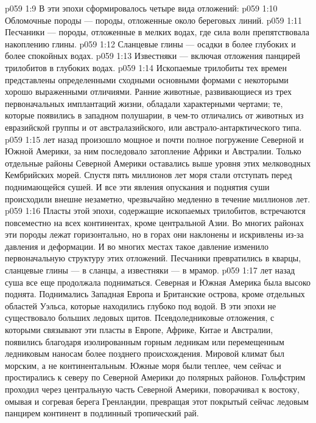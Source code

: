 \vs p059 1:9 \pc В эти эпохи сформировалось четыре вида отложений:
\vs p059 1:10 \bibnobreakspace Обломочные породы --- породы, отложенные около береговых линий.
\vs p059 1:11 \bibnobreakspace Песчаники --- породы, отложенные в мелких водах, где сила волн препятствовала накоплению глины.
\vs p059 1:12 \bibnobreakspace Сланцевые глины --- осадки в более глубоких и более спокойных водах.
\vs p059 1:13 \bibnobreakspace Известняки --- включая отложения панцирей трилобитов в глубоких водах.
\vs p059 1:14 \pc Ископаемые трилобиты тех времен представлены определенными сходными основными формами с некоторыми хорошо выраженными отличиями. Ранние животные, развивающиеся из трех первоначальных имплантаций жизни, обладали характерными чертами; те, которые появились в западном полушарии, в чем\hyp{}то отличались от животных из евразийской группы и от австралазийского, или австрало\hyp{}антарктического типа.
\vs p059 1:15 \pc {} лет назад произошло мощное и почти полное погружение Северной и Южной Америки, за ним последовало затопление Африки и Австралии. Только отдельные районы Северной Америки оставались выше уровня этих мелководных Кембрийских морей. Спустя пять миллионов лет моря стали отступать перед поднимающейся сушей. И все эти явления опускания и поднятия суши происходили внешне незаметно, чрезвычайно медленно в течение миллионов лет.
\vs p059 1:16 Пласты этой эпохи, содержащие ископаемых трилобитов, встречаются повсеместно на всех континентах, кроме центральной Азии. Во многих районах эти породы лежат горизонтально, но в горах они наклонены и искривлены из\hyp{}за давления и деформации. И во многих местах такое давление изменило первоначальную структуру этих отложений. Песчаники превратились в кварцы, сланцевые глины --- в сланцы, а известняки --- в мрамор.
\vs p059 1:17 \pc {} лет назад суша все еще продолжала подниматься. Северная и Южная Америка была высоко поднята. Поднимались Западная Европа и Британские острова, кроме отдельных областей Уэльса, которые находились глубоко под водой. В эти эпохи не существовало больших ледовых щитов. Псевдоледниковые отложения, с которыми связывают эти пласты в Европе, Африке, Китае и Австралии, появились благодаря изолированным горным ледникам или перемещенным ледниковым наносам более позднего происхождения. Мировой климат был морским, а не континентальным. Южные моря были теплее, чем сейчас и простирались к северу по Северной Америки до полярных районов. Гольфстрим проходил через центральную часть Северной Америки, поворачивал к востоку, омывая и согревая берега Гренландии, превращая этот покрытый сейчас ледовым панцирем континент в подлинный тропический рай.
